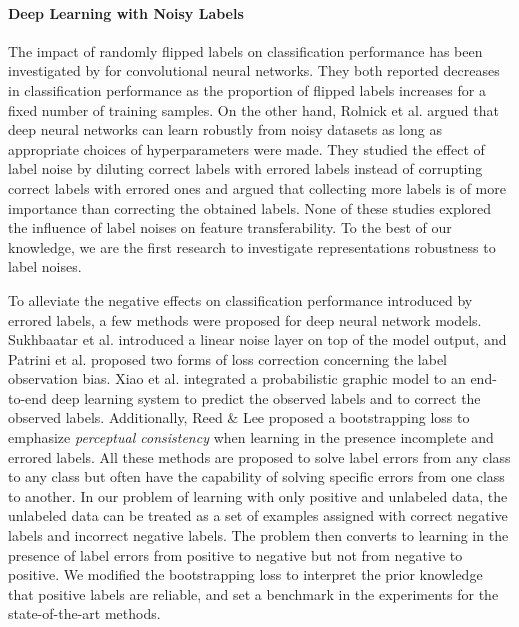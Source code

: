 
\paragraph{Deep Learning with Noisy Labels}

The impact of randomly flipped labels on classification performance has been investigated by \cite{sukhbaatar2014training,patrini2016making} for convolutional neural networks.
They both reported decreases in classification performance as the proportion of flipped labels increases for a fixed number of training samples.
On the other hand, Rolnick et al. \cite{rolnick2017deep} argued that deep neural networks can learn robustly from noisy datasets as long as appropriate choices of hyperparameters were made.
They studied the effect of label noise by diluting correct labels with errored labels instead of corrupting correct labels with errored ones and argued that collecting more labels is of more importance than correcting the obtained labels.
None of these studies explored the influence of label noises on feature transferability.
To the best of our knowledge, we are the first research to investigate representations robustness to label noises.

To alleviate the negative effects on classification performance introduced by errored labels, a few methods were proposed for deep neural network models.
Sukhbaatar et al. \cite{sukhbaatar2014training} introduced a linear noise layer on top of the model output, and Patrini et al. \cite{patrini2016making} proposed two forms of loss correction concerning the label observation bias.
Xiao et al. \cite{xiao2015learning} integrated a probabilistic graphic model to an end-to-end deep learning system to predict the observed labels and to correct the observed labels.
Additionally, Reed \& Lee \cite{reed2014training} proposed a bootstrapping loss to emphasize \textit{perceptual consistency} when learning in the presence incomplete and errored labels.
All these methods are proposed to solve label errors from any class to any class but often have the capability of solving specific errors from one class to another.
In our problem of learning with only positive and unlabeled data, the unlabeled data can be treated as a set of examples assigned with correct negative labels and incorrect negative labels.
The problem then converts to learning in the presence of label errors from positive to negative but not from negative to positive.
We modified the bootstrapping loss to interpret the prior knowledge that positive labels are reliable, and set a benchmark in the experiments for the state-of-the-art methods.

